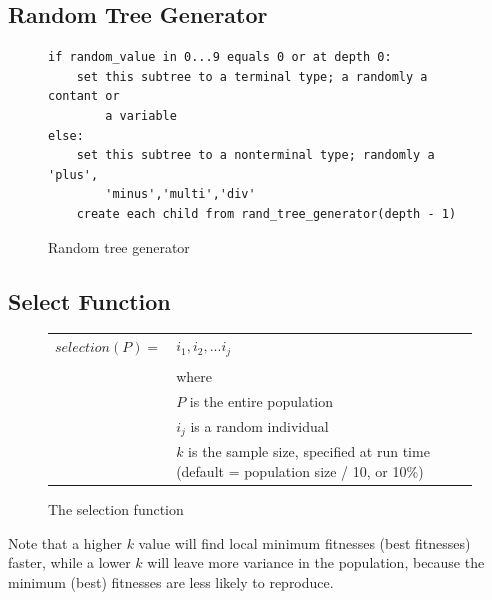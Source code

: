 \documentclass[12pt]{article}
\begin{document}
\subsection{Random Tree Generator}
\label{sec:rand_tree}
\begin{figure}[!h]
        \begin{center}
		\scriptsize
		\begin{lstlisting}
if random_value in 0...9 equals 0 or at depth 0:
	set this subtree to a terminal type; a randomly a contant or 
		a variable
else:
	set this subtree to a nonterminal type; randomly a 'plus', 
		'minus','multi','div'
	create each child from rand_tree_generator(depth - 1)
		\end{lstlisting}
		\normalsize
               \caption{Random tree generator}
                \label{rand_tree_gen}
        \end{center}
\end{figure}

\subsection{Select Function}
\label{sec:selection}
\begin{figure}[!h]
        \begin{center}
		\begin{tabular}{r l}
			$ selection(P) = $		&	$ i_1, i_2, ... i_j$ \\
								& \\
								&	where \\
								&	$ P $ is the entire population \\
								&	$ i_j $ is a random individual \\
								&	$ k $ is the sample size, specified at run time (default = population size / 10, or 10\%) \\
		\end{tabular} 
               \caption{The selection function}
                \label{selection_future}
        \end{center}
\end{figure}

Note that a higher $ k $ value will find local minimum fitnesses (best fitnesses) faster, while a lower $ k $ will leave more variance in the population, because the minimum (best) fitnesses are less likely to reproduce. 
\end{document}
